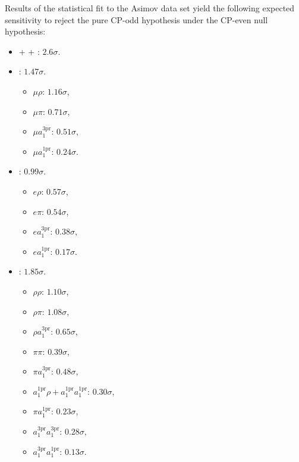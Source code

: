 Results of the statistical fit to the Asimov data set yield the following expected sensitivity to reject the pure CP-odd hypothesis under the CP-even null hypothesis:
\begin{itemize}
    \item \mt + \et + \tata: $2.6\sigma$. 
    
    \item \mt: $1.47\sigma$. 
    \begin{itemize}
        \item $\mu\rho$: $1.16\sigma$, 
        \item $\mu\pi$: $0.71\sigma$, 
        \item $\mu a_1^\text{3pr}$: $0.51\sigma$, 
        \item $\mu a_1^\text{1pr}$: $0.24\sigma$. 
    \end{itemize}
    
    \item \et: $0.99\sigma$. 
    \begin{itemize}
        \item $e\rho$: $0.57\sigma$, 
        \item $e\pi$: $0.54\sigma$, 
        \item $e a_1^\text{3pr}$: $0.38\sigma$, 
        \item $e a_1^\text{1pr}$: $0.17\sigma$. 
    \end{itemize}
    
    \item \tata:  $1.85\sigma$. 
    \begin{itemize}
        \item $\rho\rho$: $1.10\sigma$, 
        \item $\rho\pi$: $1.08\sigma$, 
        \item $\rho a_1^\text{3pr}$: $0.65\sigma$, 
        \item $\pi\pi$: $0.39\sigma$, 
        \item $\pi a_1^\text{3pr}$: $0.48\sigma$,       
        \item $a_1^\text{1pr}\rho + a_1^\text{1pr}a_1^\text{1pr}$: $0.30\sigma$, 
        \item $\pi a_1^\text{1pr}$: $0.23\sigma$,    
        \item $a_1^\text{3pr}a_1^\text{3pr}$: $0.28\sigma$, 
        \item $a_1^\text{3pr}a_1^\text{1pr}$: $0.13\sigma$. 
    \end{itemize}
\end{itemize}

